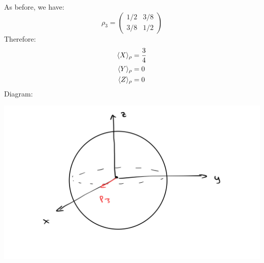 \documentclass[10pt]{article}
\begin{document}
\begin{enumerate}[label=\alph*)]
			\begin{solution}
				As before, we have:
				\[
					\rho_3 = \begin{pmatrix} 1 / 2 & 3 / 8 \\ 3 / 8 & 1 / 2 \end{pmatrix} 
				\] 
				Therefore:
				\begin{align*}
					\langle X \rangle_{\rho} &= \frac{3}{4} \\
					\langle Y \rangle_{\rho}&= 0 \\
					\langle Z \rangle_{\rho} &= 0 
				\end{align*}
				Diagram:
				\begin{center}
					\includegraphics[scale=0.2]{q3c.jpeg}
				\end{center}
			\end{solution}
	 \end{enumerate}
\end{document}
